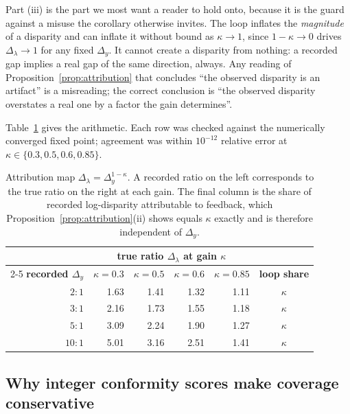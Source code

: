 \documentclass[journal,10pt,onecolumn]{IEEEtran}
\begin{document}
Part (iii) is the part we most want a reader to hold onto, because it is the
guard against a misuse the corollary otherwise invites. The loop inflates the
\emph{magnitude} of a disparity and can inflate it without bound as
$\kappa \to 1$, since $1-\kappa \to 0$ drives $\Delta_{\lambda} \to 1$ for any
fixed $\Delta_y$. It cannot create a disparity from nothing: a recorded gap
implies a real gap of the same direction, always. Any reading of
Proposition~\ref{prop:attribution} that concludes ``the observed disparity is an
artifact'' is a misreading; the correct conclusion is ``the observed disparity
overstates a real one by a factor the gain determines''.

Table~\ref{tab:s-attribution} gives the arithmetic. Each row was checked against
the numerically converged fixed point; agreement was within $10^{-12}$ relative
error at $\kappa \in \{0.3, 0.5, 0.6, 0.85\}$.

\begin{table}[!t]
  \centering
  \caption{Attribution map $\Delta_{\lambda} = \Delta_y^{1-\kappa}$. A recorded
  ratio on the left corresponds to the true ratio on the right at each gain. The
  final column is the share of recorded log-disparity attributable to feedback,
  which Proposition~\ref{prop:attribution}(ii) shows equals $\kappa$ exactly and
  is therefore independent of $\Delta_y$.}
  \label{tab:s-attribution}
  \begin{tabular}{r rrrr c}
    \toprule
    & \multicolumn{4}{c}{\textbf{true ratio $\Delta_{\lambda}$ at gain $\kappa$}}
    & \\
    \cmidrule(lr){2-5}
    \textbf{recorded $\Delta_y$} & $\kappa=0.3$ & $\kappa=0.5$ & $\kappa=0.6$
    & $\kappa=0.85$ & \textbf{loop share} \\
    \midrule
    $2{:}1$ & 1.63 & 1.41 & 1.32 & 1.11 & $\kappa$ \\
    $3{:}1$ & 2.16 & 1.73 & 1.55 & 1.18 & $\kappa$ \\
    $5{:}1$ & 3.09 & 2.24 & 1.90 & 1.27 & $\kappa$ \\
    $10{:}1$ & 5.01 & 3.16 & 2.51 & 1.41 & $\kappa$ \\
    \bottomrule
  \end{tabular}
\end{table}

\subsection{Why integer conformity scores make coverage conservative}
\label{sec:s1-lattice}
\end{document}
